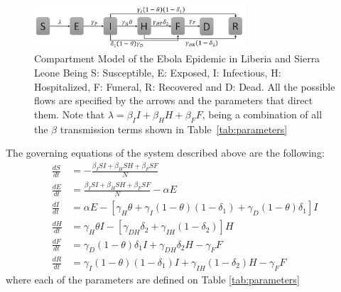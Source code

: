 \documentclass[10pt]{article}
\begin{document}
\begin{figure}
  \centering
  \includegraphics[width=0.7\textwidth]{compartment}
  \caption{Compartment Model of the Ebola Epidemic in Liberia and Sierra Leone \newline  Being S: Susceptible, E: Exposed, I: Infectious, H: Hospitalized, F: Funeral,  R: Recovered and D: Dead. All the possible flows are specified by the arrows and the parameters that direct them. Note that $\lambda = \beta_{I}I+\beta_{H}H+\beta_{F}F $, being a combination of all the $\beta$ transmission terms shown in Table~\ref{tab:parameters}} 
\label{fig:compartment} 
\end{figure}

 
The governing equations of the system described above are the following:
\begin{align*} 
\frac{dS}{dt} &= - \frac{\beta_{I}SI+\beta_{H}SH+\beta_{F}SF}{N}\\
\frac{dE}{dt} &=  \frac{\beta_{I}SI+\beta_{H}SH+\beta_{F}SF}{N}-\alpha E\\
\frac{dI}{dt} &=  \alpha E - [\gamma_{H}\theta + \gamma_{I}(1-\theta)(1-\delta_{1})+\gamma_{D}(1-\theta)\delta_{1}]I\\
\frac{dH}{dt} &= \gamma_{H}\theta I - [\gamma_{DH}\delta_{2}+\gamma_{IH}(1-\delta_{2})]H\\
\frac{dF}{dt} &= \gamma_{D}(1-\theta) \delta_{1} I + \gamma_{DH}\delta_{2} H-\gamma_{F} F\\
\frac{dR}{dt} &= \gamma_{I}(1-\theta)(1- \delta_{1}) I + \gamma_{IH}(1-\delta_{2}) H-\gamma_{F} F
\end{align*}
where each of the parameters are defined on Table \ref{tab:parameters}
\end{document}
